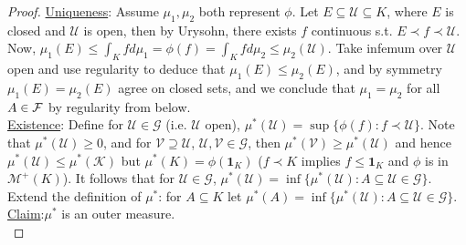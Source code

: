 \documentclass{article}
\begin{document}
\begin{proof}
    \noindent\underline{Uniqueness}: Assume $\mu_1, \mu_2$ both represent $\phi$. Let $E\subseteq\mathcal{U}\subseteq K$, where $E$ is closed and $\mathcal{U}$ is open, then by Urysohn, there exists $f$ continuous s.t. $E\prec f\prec \mathcal{U}$. Now, $\mu_1(E)\leq \int_K fd\mu_1 = \phi(f) = \int_K fd\mu_2\leq \mu_2(\mathcal{U})$. Take infemum over $\mathcal{U}$ open and use regularity to deduce that $\mu_1(E)\leq \mu_2(E)$, and by symmetry $\mu_1(E) = \mu_2(E)$ agree on closed sets, and we conclude that $\mu_1=\mu_2$ for all $A\in\mathcal{F}$ by regularity from below.\\

    \noindent\underline{Existence}: Define for $\mathcal{U}\in\mathcal{G}$ (i.e. $\mathcal{U}$ open), $\mu^*(\mathcal{U})=\sup\{\phi(f):f\prec \mathcal{U}\}$. Note that $\mu^*(\mathcal{U})\geq 0$, and for $\mathcal{V}\supseteq \mathcal{U}$, $\mathcal{U}, \mathcal{V}\in\mathcal{G}$, then $\mu^*(\mathcal{V})\geq \mu^*(\mathcal{U})$ and hence $\mu^*(\mathcal{U})\leq \mu^*(\mathcal{K})$ but $\mu^*(K)=\phi(\mathbf{1}_K)$ ($f\prec K$ implies $f\leq \mathbf{1}_K$ and $\phi$ is in $\mathcal{M}^+(K)$). It follows that for $\mathcal{U}\in\mathcal{G}$, $\mu^*(\mathcal{U})=\inf\{\mu^*(\mathcal{U}): A\subseteq\mathcal{U}\in\mathcal{G}\}$. Extend the definition of $\mu^*$: for $A\subseteq K$ let $\mu^*(A) = \inf\{\mu^*(\mathcal{U}):A\subseteq\mathcal{U}\in\mathcal{G}\}$.\\
    
    \noindent\underline{Claim}:$\mu^*$ is an outer measure.\\
    

\end{proof}
\end{document}
